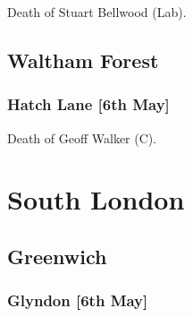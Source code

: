 \documentclass[a4paper,openany]{book}
\begin{document}
\begin{resultsiii}

Death of Stuart Bellwood (Lab).

\subsection*{Waltham Forest}

\subsubsection*{Hatch Lane \hspace*{\fill}\nolinebreak[1]%
	\enspace\hspace*{\fill}
	[6th May]}


Death of Geoff Walker (C).

\section{South London}

%
%
%
%

\subsection*{Greenwich}

\subsubsection*{Glyndon \hspace*{\fill}\nolinebreak[1]%
	\enspace\hspace*{\fill}
	[6th May]}


\end{resultsiii}
\end{document}
